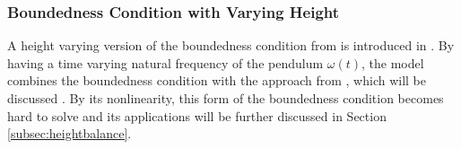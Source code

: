 \subsubsection{Boundedness Condition with Varying Height}
A height varying version of the boundedness condition from \cite{lanari2014boundedness} is introduced in \cite{caron2018balance} . By having a time varying natural frequency of the pendulum $\omega(t)$, the model combines the boundedness condition with the approach from \cite{hopkins2014humanoid}, which will be discussed . By its nonlinearity, this form of the boundedness condition becomes hard to solve and its applications will be further discussed in Section \ref{subsec:heightbalance}.
